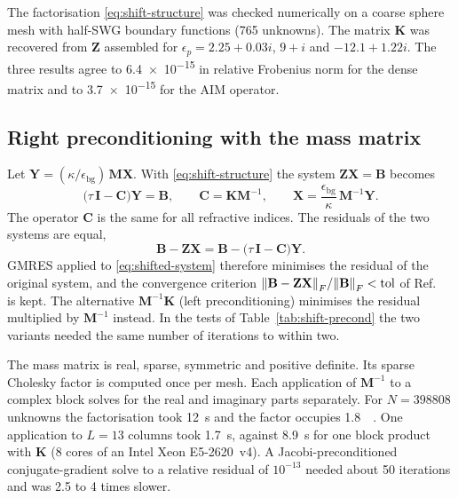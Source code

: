 \documentclass[11pt,a4paper]{article}
\begin{document}
The factorisation \eqref{eq:shift-structure} was checked numerically on
a coarse sphere mesh with half-SWG boundary functions (765 unknowns).
The matrix $\mathbf{K}$ was recovered from $\mathbf{Z}$ assembled for
$\epsilon_p = 2.25 + 0.03i$, $9 + i$ and $-12.1 + 1.22i$.
The three results agree to \num{6.4e-15} in relative Frobenius norm for
the dense matrix and to \num{3.7e-15} for the AIM operator.

\subsection{Right preconditioning with the mass matrix}
\label{sec:shift-precond}

Let $\mathbf{Y} = (\kappa/\epsilon_{\text{bg}})\,\mathbf{M}\mathbf{X}$.
With \eqref{eq:shift-structure} the system
$\mathbf{Z}\mathbf{X} = \mathbf{B}$ becomes
\begin{equation}
  \bigl(\tau\,\mathbf{I} - \mathbf{C}\bigr)\mathbf{Y} = \mathbf{B},
  \qquad
  \mathbf{C} = \mathbf{K}\mathbf{M}^{-1},
  \qquad
  \mathbf{X} = \frac{\epsilon_{\text{bg}}}{\kappa}\,
               \mathbf{M}^{-1}\mathbf{Y}.
  \label{eq:shifted-system}
\end{equation}
The operator $\mathbf{C}$ is the same for all refractive indices.
The residuals of the two systems are equal,
\begin{equation}
  \mathbf{B} - \mathbf{Z}\mathbf{X}
    = \mathbf{B} - \bigl(\tau\,\mathbf{I} - \mathbf{C}\bigr)\mathbf{Y}.
  \label{eq:shift-residual}
\end{equation}
GMRES applied to \eqref{eq:shifted-system} therefore minimises the
residual of the original system, and the convergence criterion
$\norm{\mathbf{B} - \mathbf{Z}\mathbf{X}}_F / \norm{\mathbf{B}}_F
 < \text{tol}$ of Ref.~\cite{Moteki2026} is kept.
The alternative $\mathbf{M}^{-1}\mathbf{K}$ (left preconditioning)
minimises the residual multiplied by $\mathbf{M}^{-1}$ instead.
In the tests of Table~\ref{tab:shift-precond} the two variants needed
the same number of iterations to within two.

The mass matrix is real, sparse, symmetric and positive definite.
Its sparse Cholesky factor is computed once per mesh.
Each application of $\mathbf{M}^{-1}$ to a complex block solves for the
real and imaginary parts separately.
For $N = \num{398808}$ unknowns the factorisation took
\SI{12}{\second} and the factor occupies \SI{1.8}{\giga\byte}.
One application to $L = 13$ columns took \SI{1.7}{\second}, against
\SI{8.9}{\second} for one block product with $\mathbf{K}$ (8 cores of
an Intel Xeon E5-2620~v4).
A Jacobi-preconditioned conjugate-gradient solve to a relative residual
of $10^{-13}$ needed about 50 iterations and was 2.5 to 4 times slower.
\end{document}

